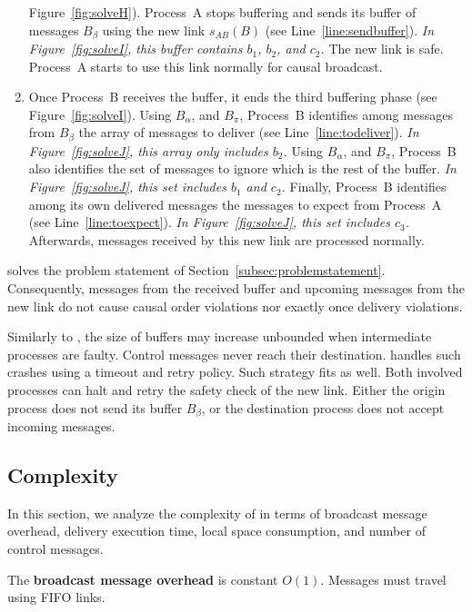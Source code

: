 \begin{enumerate}[leftmargin=*]
  Figure~\ref{fig:solveH}).  Process~A stops buffering and sends its buffer of
  messages $B_\beta$ using the new link $s_{AB}(B)$ (see
  Line~\ref{line:sendbuffer}). \emph{In Figure~\ref{fig:solveI}, this buffer
    contains $b_1$, $b_2$, and $c_2$.} The new link is safe. Process~A starts to
  use this link normally for causal broadcast.
\item Once Process~B receives the buffer, it ends the third buffering phase (see
  Figure~\ref{fig:solveI}). Using $B_\alpha$, and $B_\pi$, Process~B identifies
  among messages from $B_\beta$ the array of messages to deliver (see
  Line~\ref{line:todeliver}). \emph{In Figure~\ref{fig:solveJ}, this array only
    includes $b_2$.}  Using $B_\alpha$, and $B_\pi$, Process~B also identifies
  the set of messages to ignore which is the rest of the buffer. \emph{In
    Figure~\ref{fig:solveJ}, this set includes $b_1$ and $c_2$.} Finally,
  Process~B identifies among its own delivered messages the messages to expect
  from Process~A (see Line~\ref{line:toexpect}). \emph{In
    Figure~\ref{fig:solveJ}, this set includes $c_3$.} Afterwards, messages
  received by this new link are processed normally.
\end{enumerate}
\RPCBROADCAST solves the problem statement of
Section~\ref{subsec:problemstatement}. Consequently, messages from the received
buffer and upcoming messages from the new link do not cause causal order
violations nor exactly once delivery violations.

Similarly to \PCBROADCAST, the size of buffers may increase unbounded when
intermediate processes are faulty. Control messages never reach their
destination. \PCBROADCAST handles such crashes using a timeout and retry
policy. Such strategy fits \RPCBROADCAST as well. Both involved processes can
halt and retry the safety check of the new link. Either the origin process does
not send its buffer $B_\beta$, or the destination process does not accept
incoming messages.

\subsection{Complexity}
\label{subsec:complexity}

In this section, we analyze the complexity of \RPCBROADCAST in terms of
broadcast message overhead, delivery execution time, local space consumption,
and number of control messages. 

\noindent The \textbf{broadcast message overhead} is constant $O(1)$. Messages
must travel using FIFO links.

